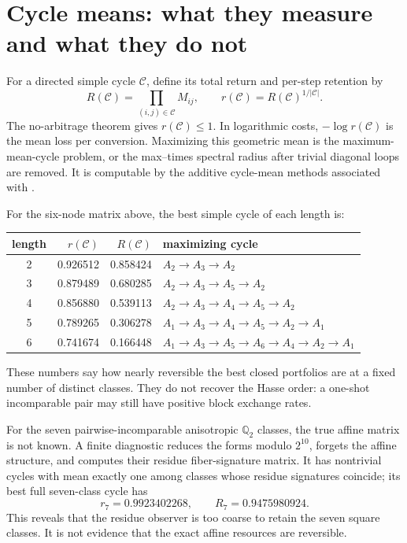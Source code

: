 \documentclass[11pt]{article}
\theoremstyle{definition}
\theoremstyle{plain}
\theoremstyle{remark}
\newcommand{\Q}{\mathbb Q}
\begin{document}
\section{Cycle means: what they measure and what they do not}
\label{sec:cycles}

For a directed simple cycle \(\mathcal C\), define its total return and
per-step retention by
\[
  R(\mathcal C)=\prod_{(i,j)\in\mathcal C}M_{ij},
  \qquad
  r(\mathcal C)=R(\mathcal C)^{1/|\mathcal C|}.
\]
The no-arbitrage theorem gives \(r(\mathcal C)\le1\).  In logarithmic costs,
\(-\log r(\mathcal C)\) is the mean loss per conversion.  Maximizing this
geometric mean is the maximum-mean-cycle problem, or the max--times spectral
radius after trivial diagonal loops are removed.  It is computable by the
additive cycle-mean methods associated with \cite{karp-cycle-mean}.

For the six-node matrix above, the best simple cycle of each length is:
\begin{center}
\begin{tabular}{@{}crrl@{}}
\toprule
length & \(r(\mathcal C)\) & \(R(\mathcal C)\) & maximizing cycle\\
\midrule
2 & 0.926512 & 0.858424 & \(A_2\to A_3\to A_2\)\\
3 & 0.879489 & 0.680285 & \(A_2\to A_3\to A_5\to A_2\)\\
4 & 0.856880 & 0.539113 & \(A_2\to A_3\to A_4\to A_5\to A_2\)\\
5 & 0.789265 & 0.306278 & \(A_1\to A_3\to A_4\to A_5\to A_2\to A_1\)\\
6 & 0.741674 & 0.166448 & \(A_1\to A_3\to A_5\to A_6\to A_4\to A_2\to A_1\)\\
\bottomrule
\end{tabular}
\end{center}
These numbers say how nearly reversible the best closed portfolios are at a
fixed number of distinct classes.  They do not recover the Hasse order: a
one-shot incomparable pair may still have positive block exchange rates.

For the seven pairwise-incomparable anisotropic \(\Q_2\) classes, the true
affine matrix is not known.  A finite diagnostic reduces the forms modulo
\(2^{10}\), forgets the affine structure, and computes their residue
fiber-signature matrix.  It has nontrivial cycles with mean exactly one among
classes whose residue signatures coincide; its best full seven-class cycle
has
\[
  r_7=0.9923402268,
  \qquad R_7=0.9475980924.
\]
This reveals that the residue observer is too coarse to retain the seven
square classes.  It is not evidence that the exact affine resources are
reversible.
\end{document}

